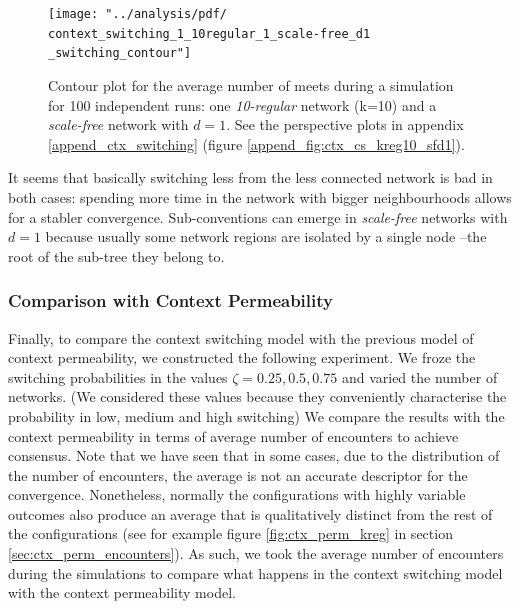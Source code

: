 \documentclass[preprint,number]{elsarticle}
\begin{document}
\begin{figure}[H]
	\centering
	\texttt{[image: "../analysis/pdf/ context\_switching\_1\_10regular\_1\_scale-free\_d1 \_switching\_contour"]}
	\begin{minipage}{0.9\textwidth}
		\caption{Contour plot for the average number of meets during a simulation for 100 independent runs: one \textit{10-regular} network (k=10) and a \textit{scale-free} network with $d=1$. See the perspective plots in  appendix \ref{append_ctx_switching} (figure \ref{append_fig:ctx_cs_kreg10_sfd1}).
		}
		\label{fig:ctx_cs_kreg10_sfd1}
	\end{minipage}
\end{figure}

It seems that basically switching less from the less connected network is bad in both cases: spending more time in the network with bigger neighbourhoods allows for a stabler convergence. Sub-conventions can emerge in \textit{scale-free} networks with $d=1$ because usually some network regions are isolated by a single node --the root of the sub-tree they belong to. 



\subsubsection{Comparison with Context Permeability}
Finally, to compare the context switching model with the previous model of context permeability, we constructed the following experiment. We froze the switching probabilities in the values $\zeta={0.25,0.5,0.75}$ and varied the number of networks. (We considered these values because they conveniently characterise the probability in low, medium and high switching) We compare the results with the context permeability in terms of average number of encounters to achieve consensus. Note that we have seen that in some cases, due to the distribution of the number of encounters, the average is not an accurate descriptor for the convergence. Nonetheless, normally the configurations with highly variable outcomes also produce an average that is qualitatively distinct from the rest of the configurations (see for example figure \ref{fig:ctx_perm_kreg} in section \ref{sec:ctx_perm_encounters}). As such, we took the average number of encounters during the simulations to compare what happens in the context switching model with the context permeability model.
\end{document}
